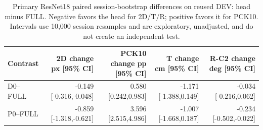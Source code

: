 \begin{table}[t]\centering\footnotesize
\caption{Primary ResNet18 paired session-bootstrap differences on reused DEV: head minus FULL. Negative favors the head for 2D/T/R; positive favors it for PCK10. Intervals use 10,000 session resamples and are exploratory, unadjusted, and do not create an independent test.}\label{tab:resnetpaired}
\begin{tabular}{lrrrr}\toprule
Contrast & 2D change px [95\% CI] & PCK10 change pp [95\% CI] & T change cm [95\% CI] & R-C2 change deg [95\% CI]\\\midrule
D0--FULL & -0.149 [-0.316,-0.048] & 0.580 [0.242,0.983] & -1.171 [-1.388,0.149] & -0.034 [-0.216,0.062]\\
P0--FULL & -0.859 [-1.318,-0.621] & 3.596 [2.515,4.986] & -1.007 [-1.668,0.187] & -0.234 [-0.502,-0.022]\\
\bottomrule\end{tabular}
\end{table}
